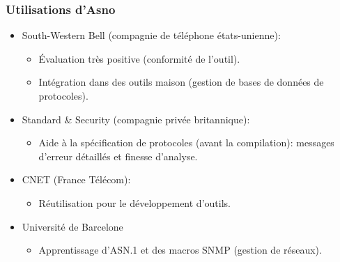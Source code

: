 \documentclass[compress,dvips,xcolor={dvipsnames},t]{beamer}
\begin{document}
\begin{frame}
\frametitle{Utilisations d'\textsf{Asno}}

\begin{itemize}

  \item South-Western Bell (compagnie de téléphone états-unienne):

        \begin{itemize}

          \item Évaluation très positive (conformité de l'outil).

          \item Intégration dans des outils maison (gestion de bases
                de données de protocoles).

        \end{itemize}

  \item Standard \& Security (compagnie privée britannique):

        \begin{itemize}

          \item Aide à la spécification de protocoles (avant la
                compilation): messages d'erreur détaillés et finesse
                d'analyse.

        \end{itemize}

  \item CNET (France Télécom):

        \begin{itemize}

           \item Réutilisation pour le développement d'outils.

        \end{itemize}

  \item Université de Barcelone

        \begin{itemize}

          \item Apprentissage d'ASN.1 et des macros SNMP (gestion de
                réseaux).

        \end{itemize}

\end{itemize}

\end{frame}
\end{document}
